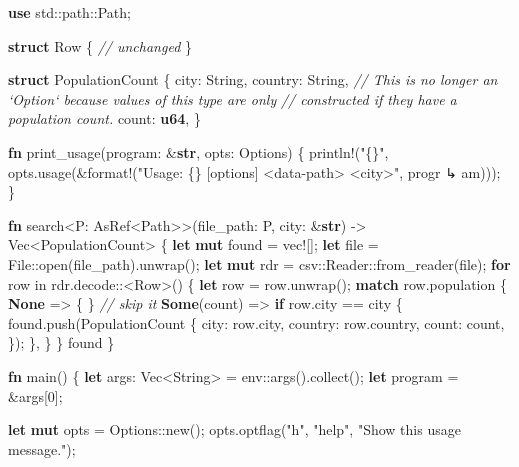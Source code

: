 \documentclass[a4paper,]{book}
\newenvironment{Shaded}{\begin{snugshade}}{\end{snugshade}}
\newcommand{\KeywordTok}[1]{\textcolor[rgb]{0.13,0.29,0.53}{\textbf{{#1}}}}
\newcommand{\DecValTok}[1]{\textcolor[rgb]{0.00,0.00,0.81}{{#1}}}
\newcommand{\StringTok}[1]{\textcolor[rgb]{0.31,0.60,0.02}{{#1}}}
\newcommand{\CommentTok}[1]{\textcolor[rgb]{0.56,0.35,0.01}{\textit{{#1}}}}
\newcommand{\OtherTok}[1]{\textcolor[rgb]{0.56,0.35,0.01}{{#1}}}
\newcommand{\NormalTok}[1]{{#1}}
\begin{document}
\begin{Shaded}
\begin{Highlighting}[]
\KeywordTok{use} \NormalTok{std::path::Path;}

\KeywordTok{struct} \NormalTok{Row \{}
    \CommentTok{// unchanged}
\NormalTok{\}}

\KeywordTok{struct} \NormalTok{PopulationCount \{}
    \NormalTok{city: String,}
    \NormalTok{country: String,}
    \CommentTok{// This is no longer an `Option` because values of this type are only}
    \CommentTok{// constructed if they have a population count.}
    \NormalTok{count: }\KeywordTok{u64}\NormalTok{,}
\NormalTok{\}}

\KeywordTok{fn} \NormalTok{print_usage(program: &}\KeywordTok{str}\NormalTok{, opts: Options) \{}
    \OtherTok{println!}\NormalTok{(}\StringTok{"\{\}"}\NormalTok{, opts.usage(&}\OtherTok{format!}\NormalTok{(}\StringTok{"Usage: \{\} [options] <data-path> <city>"}\NormalTok{, progr}
\NormalTok{↳ am)));}
\NormalTok{\}}

\KeywordTok{fn} \NormalTok{search<P: AsRef<Path>>(file_path: P, city: &}\KeywordTok{str}\NormalTok{) -> Vec<PopulationCount> \{}
    \KeywordTok{let} \KeywordTok{mut} \NormalTok{found = }\OtherTok{vec!}\NormalTok{[];}
    \KeywordTok{let} \NormalTok{file = File::open(file_path).unwrap();}
    \KeywordTok{let} \KeywordTok{mut} \NormalTok{rdr = csv::Reader::from_reader(file);}
    \KeywordTok{for} \NormalTok{row in rdr.decode::<Row>() \{}
        \KeywordTok{let} \NormalTok{row = row.unwrap();}
        \KeywordTok{match} \NormalTok{row.population \{}
            \KeywordTok{None} \NormalTok{=> \{ \} }\CommentTok{// skip it}
            \KeywordTok{Some}\NormalTok{(count) => }\KeywordTok{if} \NormalTok{row.city == city \{}
                \NormalTok{found.push(PopulationCount \{}
                    \NormalTok{city: row.city,}
                    \NormalTok{country: row.country,}
                    \NormalTok{count: count,}
                \NormalTok{\});}
            \NormalTok{\},}
        \NormalTok{\}}
    \NormalTok{\}}
    \NormalTok{found}
\NormalTok{\}}

\KeywordTok{fn} \NormalTok{main() \{}
    \KeywordTok{let} \NormalTok{args: Vec<String> = env::args().collect();}
    \KeywordTok{let} \NormalTok{program = &args[}\DecValTok{0}\NormalTok{];}

    \KeywordTok{let} \KeywordTok{mut} \NormalTok{opts = Options::new();}
    \NormalTok{opts.optflag(}\StringTok{"h"}\NormalTok{, }\StringTok{"help"}\NormalTok{, }\StringTok{"Show this usage message."}\NormalTok{);}


\end{Highlighting}
\end{Shaded}
\end{document}

